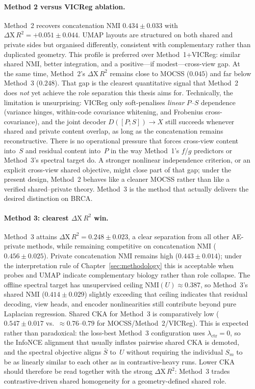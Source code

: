 \paragraph{Method 2 versus VICReg ablation.}
Method~2 recovers concatenation NMI $0.434\pm0.033$ with $\Delta\mathrm{X}\,R^{2}=+0.051\pm0.044$. UMAP layouts are structured on both shared and private sides but organised differently, consistent with complementary rather than duplicated geometry. This profile is preferred over Method~1+VICReg: similar shared NMI, better integration, and a positive---if modest---cross-view gap. At the same time, Method~2's $\Delta\mathrm{X}\,R^{2}$ remains close to MOCSS ($0.045$) and far below Method~3 ($0.248$). That gap is the clearest quantitative signal that Method~2 does \emph{not} yet achieve the role separation this thesis aims for. Technically, the limitation is unsurprising: VICReg only soft-penalises \emph{linear} $P$--$S$ dependence (variance hinges, within-code covariance whitening, and Frobenius cross-covariance), and the joint decoder $D([P;S])\rightarrow X$ still succeeds whenever shared and private content overlap, as long as the concatenation remains reconstructive. There is no operational pressure that forces cross-view content into~$S$ and residual content into~$P$ in the way Method~1's $f$/$g$ predictors or Method~3's spectral target do. A stronger nonlinear independence criterion, or an explicit cross-view shared objective, might close part of that gap; under the present design, Method~2 behaves like a cleaner MOCSS rather than like a verified shared--private theory. Method~3 is the method that actually delivers the desired distinction on BRCA.

\paragraph{Method 3: clearest $\Delta\mathrm{X}\,R^{2}$ win.}
Method~3 attains $\Delta\mathrm{X}\,R^{2}=0.248\pm0.023$, a clear separation from all other AE-private methods, while remaining competitive on concatenation NMI ($0.456\pm0.025$). Private concatenation NMI remains high ($0.443\pm0.014$); under the interpretation rule of Chapter~\ref{sec:methodology} this is acceptable when probes and UMAP indicate complementary biology rather than role collapse. The offline spectral target has unsupervised ceiling $\mathrm{NMI}(U)\approx0.387$, so Method~3's shared NMI ($0.414\pm0.029$) slightly exceeding that ceiling indicates that residual decoding, view heads, and encoder nonlinearities still contribute beyond pure Laplacian regression. Shared CKA for Method~3 is comparatively low ($0.547\pm0.017$ vs.\ $\approx0.76$--$0.79$ for MOCSS/Method~2/VICReg). This is expected rather than paradoxical: the loss-best Method~3 configuration uses $\lambda_{\mathrm{ctr}}=0$, so the InfoNCE alignment that usually inflates pairwise shared CKA is demoted, and the spectral objective aligns $\bar{S}$ to~$U$ without requiring the individual $S_m$ to be as linearly similar to each other as in contrastive-heavy runs. Lower CKA should therefore be read together with the strong $\Delta\mathrm{X}\,R^{2}$: Method~3 trades contrastive-driven shared homogeneity for a geometry-defined shared role.

